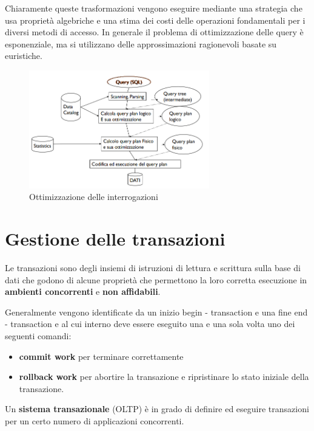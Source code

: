 Chiaramente queste trasformazioni vengono eseguire mediante una strategia che
usa proprietà algebriche e una stima dei costi delle operazioni fondamentali per
i diversi metodi di accesso. In generale il problema di ottimizzazione delle
query è esponenziale, ma si utilizzano delle approssimazioni ragionevoli basate
su euristiche.
\begin{figure}[!ht]
      \centering
      \includegraphics[width=0.7\textwidth]{./img/DBMS/Ottimizzazione_query.png}
      \caption{Ottimizzazione delle interrogazioni}
      \label{fig:Query_Optimization}
\end{figure}
\section{Gestione delle transazioni}
Le transazioni sono degli insiemi di istruzioni di lettura e scrittura sulla base
di dati che godono di alcune proprietà che permettono la loro corretta esecuzione
in \textbf{ambienti concorrenti} e \textbf{non affidabili}.

Generalmente vengono identificate da un inizio begin - transaction e una fine
end - transaction e al cui interno deve essere eseguito una e una sola
volta uno dei seguenti comandi:
\begin{itemize}
      \item \textbf{commit work} per terminare correttamente
      \item \textbf{rollback work} per abortire la transazione e ripristinare lo
            stato iniziale della transazione.
\end{itemize}
Un \textbf{sistema transazionale} (OLTP) è in grado di definire ed eseguire
transazioni per un certo numero di applicazioni concorrenti.

